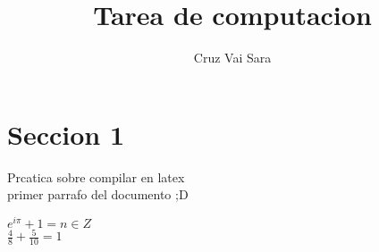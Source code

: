 \documentclass[a4paper,10pt]{article}
\begin{document}
\title{ Tarea de computacion } 
\author{Cruz Vai Sara}
\maketitle

%   

\section{Seccion 1}

Prcatica sobre compilar en latex  \\ 

primer parrafo del documento ;D

$e^{i \pi} + 1 = n\in {Z}$ \\
$\frac{4}{8}+\frac{5}{10}=1$
\end{document}
